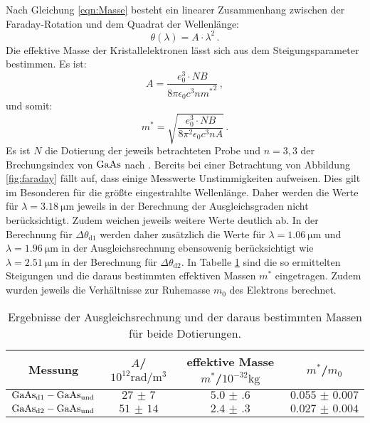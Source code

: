 Nach Gleichung \eqref{eqn:Masse} besteht ein linearer Zusammenhang zwischen der Faraday-Rotation und dem Quadrat der Wellenlänge:
\begin{equation}
    \theta(\lambda)=A\cdot\lambda^2 \, \mathrm{.}
\end{equation}
Die effektive Masse der Kristallelektronen lässt sich aus dem Steigungsparameter bestimmen.
Es ist:
\begin{equation}
  A=\frac{e_{\mathrm{0}}^3 \cdot NB}{8\pi \epsilon_{\mathrm{0}} c^3 n {m^{*}}^2} \, \mathrm{,}
\end{equation}
und somit:
\begin{equation}
  {m^{*}}=\sqrt{\frac{e_{\mathrm{0}}^3 \cdot NB}{8\pi^2 \epsilon_{\mathrm{0}} c^3 n A}} \, \mathrm{.}
\end{equation}
Es ist $N$ die Dotierung der jeweils betrachteten Probe und $n=3,3$ der Brechungsindex von $\ce{GaAs}$ nach \cite{ioffe}.
Bereits bei einer Betrachtung von Abbildung \ref{fig:faraday} fällt auf, dass einige Messwerte Unstimmigkeiten aufweisen. Dies gilt im Besonderen für die größte eingestrahlte Wellenlänge. Daher werden die Werte für $\lambda=\SI{3.18}{\micro\meter}$ jeweils in der Berechnung der Ausgleichsgraden nicht berücksichtigt.
Zudem weichen jeweils weitere Werte deutlich ab. In der Berechnung für $\Delta \theta_{\mathrm{d1}}$ werden daher zusätzlich die Werte für $\lambda=\SI{1.06}{\micro\meter}$ und $\lambda=\SI{1.96}{\micro\meter}$ in der Ausgleichsrechnung ebensowenig berücksichtigt wie $\lambda=\SI{2.51}{\micro\meter}$ in der Berechnung für
 $\Delta \theta_{\mathrm{d2}}$.
In Tabelle \ref{tab:steigung} sind die so ermittelten Steigungen und die daraus bestimmten effektiven Massen $m^{*}$ eingetragen. Zudem wurden jeweils die Verhältnisse zur Ruhemasse $m_{0}$ des Elektrons berechnet.
\begin{table}
  \centering
  \caption{Ergebnisse der Ausgleichsrechnung und der daraus bestimmten Massen für beide Dotierungen.}
  \label{tab:steigung}
  \begin{tabular}{cccc}
    \toprule
    Messung&$A$/$10^{12}\si{\radian\per\cubic\metre}$&effektive Masse  $m^{*}$/$10^{-32}\si{\kilo\gram}$&$m^{*}$/$m_{0}$\\
    \midrule
    $\ce{GaAs}_{\mathrm{d1}}-\ce{GaAs}_{\mathrm{und}}$&$\num{27(7)}$&$\num{5.0(6)}$&$\num{0.055(7)}$\\
    $\ce{GaAs}_{\mathrm{d2}}-\ce{GaAs}_{\mathrm{und}}$&$\num{51(14)}$&$\num{2.4(3)}$&$\num{0.027(4)}$\\
    \bottomrule
  \end{tabular}
\end{table}
